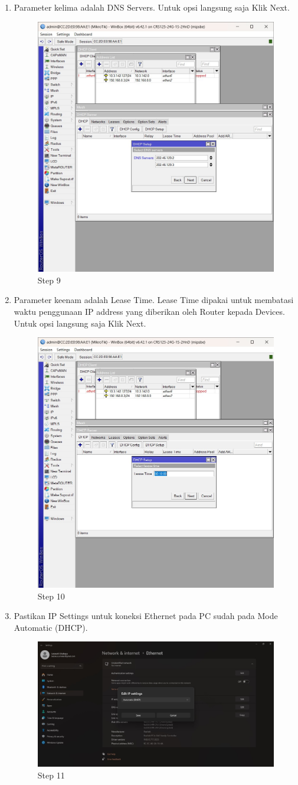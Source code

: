 \begin{enumerate}
	\item Parameter kelima adalah DNS Servers. Untuk opsi langsung saja Klik Next.
	\begin{figure}[H]
		\centering
		\includegraphics[width=0.5\linewidth]{P3/img/step9.jpg}
		\caption{Step 9}
		\label{fig:gambar4}
	\end{figure}

	\item Parameter keenam adalah Lease Time. Lease Time dipakai untuk membatasi waktu penggunaan IP address yang diberikan oleh Router kepada Devices. Untuk opsi langsung saja Klik
	Next.
	\begin{figure}[H]
		\centering
		\includegraphics[width=0.5\linewidth]{P3/img/step10.jpg}
		\caption{Step 10}
		\label{fig:gambar4}
	\end{figure}

	\item Pastikan IP Settings untuk koneksi Ethernet pada PC sudah pada Mode Automatic (DHCP).
	\begin{figure}[H]
		\centering
		\includegraphics[width=0.5\linewidth]{P3/img/step11.jpg}
		\caption{Step 11}
		\label{fig:gambar4}
	\end{figure}


\end{enumerate}
